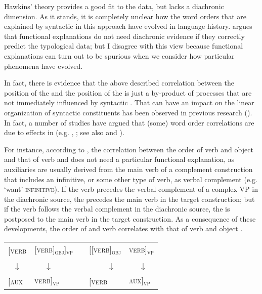 \documentclass[output=paper]{langsci/langscibook}
\begin{document}
Hawkins’ theory provides a good fit to the data, but lacks a diachronic dimension. As it stands, it is completely unclear how the word orders that are explained by syntactic  in this approach have evolved in language history.  argues that functional explanations do not need diachronic evidence if they correctly predict the typological data; but I disagree with this view because functional explanations can turn out to be spurious when we consider how particular phenomena have evolved.

In fact, there is evidence that the above described correlation between the position of the  and the position of the  is just a by-product of  processes that are not immediately influenced by syntactic . That  can have an impact on the linear organization of syntactic constituents has been observed in previous research (\citealt{Li1974_Chin}). In fact, a number of studies have argued that (some) word order correlations are due to  effects in  (e.g. \citealt{Givón1975}, \citealt{Aristar1991,Bybee2010,Collins2012}; see also  and ). 

\largerpage

For instance, according to \citet[111]{Bybee2010}, the correlation between the order of verb and object and that of verb and  does not need a particular functional explanation, as auxiliaries are usually derived from the main verb of a complement construction that includes an infinitive, or some other type of verb, as verbal complement (e.g. `want' \textsc{infinitive}). If the verb precedes the verbal complement of a complex VP in the diachronic source, the  precedes the main verb in the target construction; but if the verb follows the verbal complement in the diachronic source, the  is postposed to the main verb in the target construction. As a consequence of these developments, the order of  and verb correlates with that of verb and object .

\ea\label{ex:diessel:18}
\begin{tabular}[t]{@{}llcll@{}}
{[\textsc{verb}} & {\textsc{[verb]\textsubscript{obj}]\textsubscript{vp}}} & \hspace{2cm} & {\textsc{[[verb]\textsubscript{obj}}} & {\textsc{verb]\textsubscript{vp}}} \\
\multicolumn{1}{c}{↓}  & ~~~↓ & & ~~~~~↓ & ~~~↓\\
{\textsc{[aux}}  & {\textsc{verb]\textsubscript{vp}}}                      &  & {\textsc{[verb}}  & {\textsc{aux]\textsubscript{vp}}}\\
\end{tabular}
\z
\end{document}
